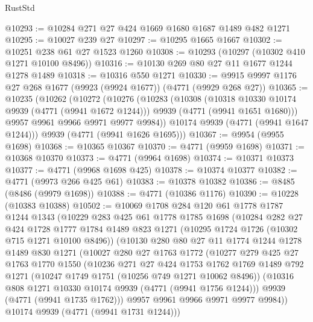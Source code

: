\begin{lexlean}{RustStd}
\begin{coremodule}
@10293 := @10284 @271 @27 @424 @1669 @1680 @1687 @1489 @482 @1271
@10295 := @10027 @239 @27
@10297 := @10295 @1665 @1667
@10302 := @10251 @238 @61 @27 @1523 @1260
@10308 := @10293 (@10297 (@10302 @410 @1271 @10100 @8496))
@10316 := @10130 @269 @80 @27 @11 @1677 @1244 @1278 @1489
@10318 := @10316 @550 @1271
@10330 := @9915 @9997 @1176 @27 @268 @1677 (@9923 (@9924 @1677)) (@4771 (@9929 @268 @27))
@10365 := @10235
    (@10262
      (@10272
        (@10276
          (@10283
            (@10308
              (@10318 @10330 @10174 @9939 (@4771 (@9941 @1672 @1244)))
              @9939
              (@4771 (@9941 @1651 @1680)))
            @9957
            @9961
            @9966
            @9971
            @9977
            @9984))
        @10174
        @9939
        (@4771 (@9941 @1647 @1244)))
      @9939
      (@4771 (@9941 @1626 @1695)))
@10367 := @9954 (@9955 @1698)
@10368 := @10365 @10367
@10370 := @4771 (@9959 @1698)
@10371 := @10368 @10370
@10373 := @4771 (@9964 @1698)
@10374 := @10371 @10373
@10377 := @4771 (@9968 @1698 @425)
@10378 := @10374 @10377
@10382 := @4771 (@9973 @266 @425 @61)
@10383 := @10378 @10382
@10386 := @8485 (@8486 (@9979 @1698))
@10388 := @4771 (@10386 @1176)
@10390 := @10228 (@10383 @10388)
@10502 := @10069
    @1708
    @284
    @120
    @61
    @1778
    @1787
    @1244
    @1343
    (@10229
      @283
      @425
      @61
      @1778
      @1785
      @1698
      (@10284
        @282
        @27
        @424
        @1728
        @1777
        @1784
        @1489
        @823
        @1271
        (@10295 @1724 @1726 (@10302 @715 @1271 @10100 @8496))
        (@10130
          @280
          @80
          @27
          @11
          @1774
          @1244
          @1278
          @1489
          @830
          @1271
          (@10027
            @280
            @27
            @1763
            @1772
            (@10277
              @279
              @425
              @27
              @1763
              @1770
              @1550
              (@10236
                @271
                @27
                @424
                @1753
                @1762
                @1769
                @1489
                @792
                @1271
                (@10247 @1749 @1751 (@10256 @749 @1271 @10062 @8496))
                (@10316 @808 @1271 @10330 @10174 @9939 (@4771 (@9941 @1756 @1244)))
                @9939
                (@4771 (@9941 @1735 @1762)))
              @9957
              @9961
              @9966
              @9971
              @9977
              @9984))
          @10174
          @9939
          (@4771 (@9941 @1731 @1244)))

\end{coremodule}
\end{lexlean}
